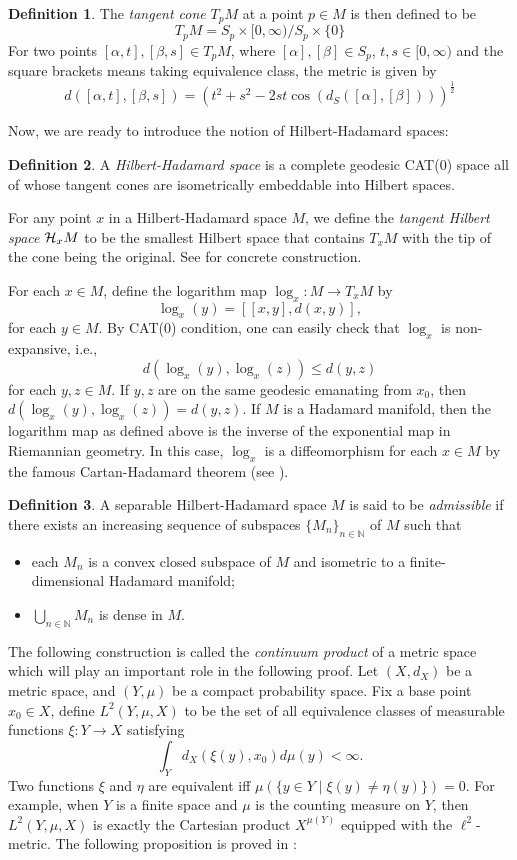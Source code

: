 \documentclass[11pt]{article}
\theoremstyle{definition}
\newtheorem{Def}{Definition}[section]
\theoremstyle{plain}
\def\IN{\mathbb N}\def\IR{\mathbb R}\def\IE{\mathbb E}\def\IC{\mathbb C}\def\IL{\mathbb L}\def\IQ{\mathbb Q}\def\IA{\mathbb A}\def\IZ{\mathbb Z}
\begin{document}
\begin{Def}
The \emph{tangent cone} $T_pM$ at a point $p\in M$ is then defined to be 
$$T_pM=S_p\times[0,\infty)/S_p\times\{0\}$$
For two points $[\alpha,t],[\beta,s]\in T_pM$, where $[\alpha],[\beta]\in S_p$, $t,s\in[0,\infty)$ and the square brackets means taking equivalence class, the metric is given by
$$d([\alpha,t],[\beta,s])=(t^2+s^2-2st\cos(d_S([\alpha],[\beta])))^{\frac12}$$
\end{Def}

Now, we are ready to introduce the notion of Hilbert-Hadamard spaces:

\begin{Def}\label{HHspace}
A \emph{Hilbert-Hadamard space} is a complete geodesic CAT(0) space all of whose tangent cones are isometrically embeddable into Hilbert spaces.
\end{Def}

For any point $x$ in a Hilbert-Hadamard space $M$, we define the \emph{tangent Hilbert space} $\mathcal H_xM$ to be the smallest Hilbert space that contains $T_xM$ with the tip of the cone being the original. See \cite[Construction 2.14]{GWY2018} for concrete construction.

For each $x\in M$, define the logarithm map $\log_x:M\to T_xM$ by
$$\log_x(y)=\left[[x,y],d(x,y)\right],$$
for each $y\in M$. By CAT(0) condition, one can easily check that $\log_x$ is non-expansive, i.e.,
$$d(\log_x(y),\log_x(z))\leq d(y,z)$$
for each $y,z\in M$. If $y,z$ are on the same geodesic emanating from $x_0$, then $d(\log_x(y),\log_x(z))=d(y,z)$. If $M$ is a Hadamard manifold, then the logarithm map as defined above is the inverse of the exponential map in Riemannian geometry. In this case, $\log_x$ is a diffeomorphism for each $x\in M$ by the famous Cartan-Hadamard theorem (see \cite[Theorem 12.8]{GTM176}).

\begin{Def}
A separable Hilbert-Hadamard space $M$ is said to be \emph{admissible} if there exists an increasing sequence of subspaces $\{M_n\}_{n\in\IN}$ of $M$ such that\begin{itemize}
\item[(1)] each $M_n$ is a convex closed subspace of $M$ and isometric to a finite-dimensional Hadamard manifold;
\item[(2)] $\bigcup_{n\in\IN}M_n$ is dense in $M$.
\end{itemize}\end{Def}

The following construction is called the \emph{continuum product} of a metric space which will play an important role in the following proof. Let $(X,d_X)$ be a metric space, and $(Y,\mu)$ be a compact probability space. Fix a base point $x_0\in X$, define $L^2(Y,\mu, X)$ to be the set of all equivalence classes of measurable functions $\xi: Y\to X$ satisfying
$$\int_Yd_X(\xi(y),x_0)d\mu(y)<\infty.$$
Two functions $\xi$ and $\eta$ are equivalent iff $\mu(\{y\in Y\mid \xi(y)\ne\eta(y)\})=0$. For example, when $Y$ is a finite space and $\mu$ is the counting measure on $Y$, then $L^2(Y,\mu,X)$ is exactly the Cartesian product $X^{\mu(Y)}$ equipped with the $\ell^2$-metric. The following proposition is proved in \cite[Proposition 3.13]{GWY2018}:
\end{document}
